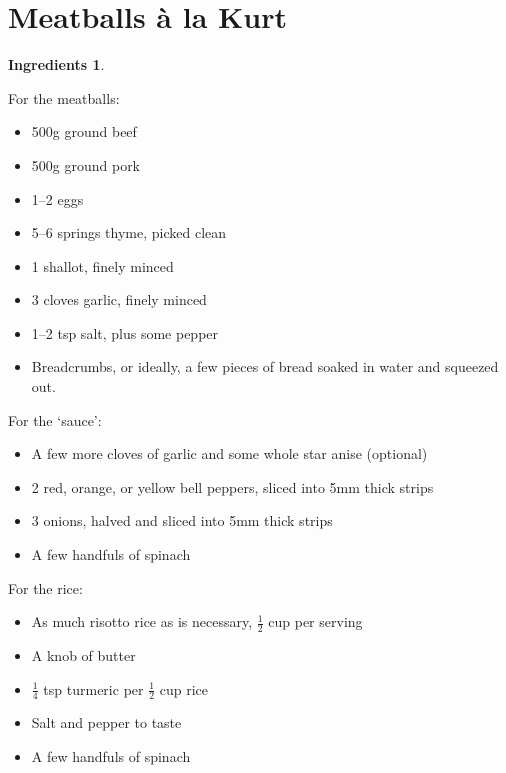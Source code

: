 \documentclass[a4paper,12pt]{scrreprt}
\theoremstyle{definition}
\newtheorem*{ingredients}{Ingredients}
\theoremstyle{plain}
\theoremstyle{remark}
\begin{document}
\section{Meatballs \`a la Kurt}\label{sec:meatballs_a_la_kurt}
\begin{ingredients}
  $\,$

  For the meatballs:
  \begin{multicols}{2}
    \begin{itemize}
      \item 500g ground beef

      \item 500g ground pork

      \item 1--2 eggs

      \item 5--6 springs thyme, picked clean

      \item 1 shallot, finely minced

      \item 3 cloves garlic, finely minced

      \item 1--2 tsp salt, plus some pepper

      \item Breadcrumbs, or ideally, a few pieces of bread soaked in water and squeezed out.
    \end{itemize}
  \end{multicols}
  For the `sauce':
  \begin{multicols}{2}

    \begin{itemize}
      \item A few more cloves of garlic and some whole star anise (optional)

      \item 2 red, orange, or yellow bell peppers, sliced into 5mm thick strips

      \item 3 onions, halved and sliced into 5mm thick strips

      \item A few handfuls of spinach
    \end{itemize}
  \end{multicols}
  For the rice:
  \begin{multicols}{2}
    \begin{itemize}
      \item As much risotto rice as is necessary, $\frac{1}{2}$ cup per serving

      \item A knob of butter

      \item $\frac{1}{4}$ tsp turmeric per $\frac{1}{2}$ cup rice

      \item Salt and pepper to taste

      \item A few handfuls of spinach
    \end{itemize}
  \end{multicols}
\end{ingredients}
\end{document}
